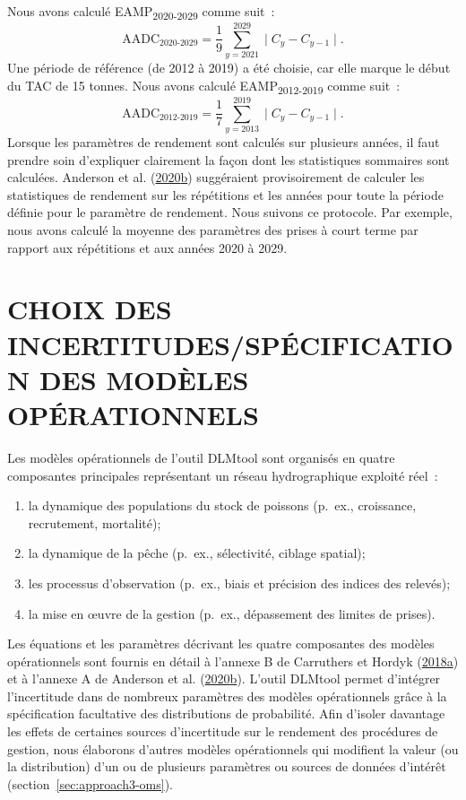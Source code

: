 \documentclass[french,11pt]{book}
\begin{document}
Nous avons calculé EAMP\textsubscript{2020-2029} comme suit~:
\begin{equation}
\textrm{AADC}_\textrm{2020-2029} = \dfrac{1}{9}\sum_{y=2021}^{2029} \mid C_y - C_{y-1} \mid.
\end{equation}
Une période de référence (de 2012 à 2019) a été choisie, car elle marque le début du TAC de 15 tonnes. Nous avons calculé EAMP\textsubscript{2012-2019} comme suit~:
\begin{equation}
\textrm{AADC}_\textrm{2012-2019} = \dfrac{1}{7}\sum_{y=2013}^{2019} \mid C_y - C_{y-1} \mid.
\end{equation}
Lorsque les paramètres de rendement sont calculés sur plusieurs années, il faut prendre soin d'expliquer clairement la façon dont les statistiques sommaires sont calculées. Anderson et al. (\protect\hyperlink{ref-anderson2020gfmp}{2020}\protect\hyperlink{ref-anderson2020gfmp}{b}) suggéraient provisoirement de calculer les statistiques de rendement sur les répétitions et les années pour toute la période définie pour le paramètre de rendement. Nous suivons ce protocole. Par exemple, nous avons calculé la moyenne des paramètres des prises à court terme par rapport aux répétitions et aux années 2020 à 2029.

\hypertarget{sec:om}{%
\section{CHOIX DES INCERTITUDES/SPÉCIFICATION DES MODÈLES OPÉRATIONNELS}\label{sec:om}}

Les modèles opérationnels de l'outil DLMtool sont organisés en quatre composantes principales représentant un réseau hydrographique exploité réel~:
\begin{enumerate}
\def\labelenumi{\arabic{enumi}.}

\item
  la dynamique des populations du stock de poissons (p.~ex., croissance, recrutement, mortalité);
\item
  la dynamique de la pêche (p.~ex., sélectivité, ciblage spatial);
\item
  les processus d'observation (p.~ex., biais et précision des indices des relevés);
\item
  la mise en œuvre de la gestion (p.~ex., dépassement des limites de prises).
\end{enumerate}
Les équations et les paramètres décrivant les quatre composantes des modèles opérationnels sont fournis en détail à l'annexe B de Carruthers et Hordyk (\protect\hyperlink{ref-carruthers2018}{2018}\protect\hyperlink{ref-carruthers2018}{a}) et à l'annexe A de Anderson et al. (\protect\hyperlink{ref-anderson2020gfmp}{2020}\protect\hyperlink{ref-anderson2020gfmp}{b}). L'outil DLMtool permet d'intégrer l'incertitude dans de nombreux paramètres des modèles opérationnels grâce à la spécification facultative des distributions de probabilité. Afin d'isoler davantage les effets de certaines sources d'incertitude sur le rendement des procédures de gestion, nous élaborons d'autres modèles opérationnels qui modifient la valeur (ou la distribution) d'un ou de plusieurs paramètres ou sources de données d'intérêt (section~\ref{sec:approach3-oms}).
\end{document}
